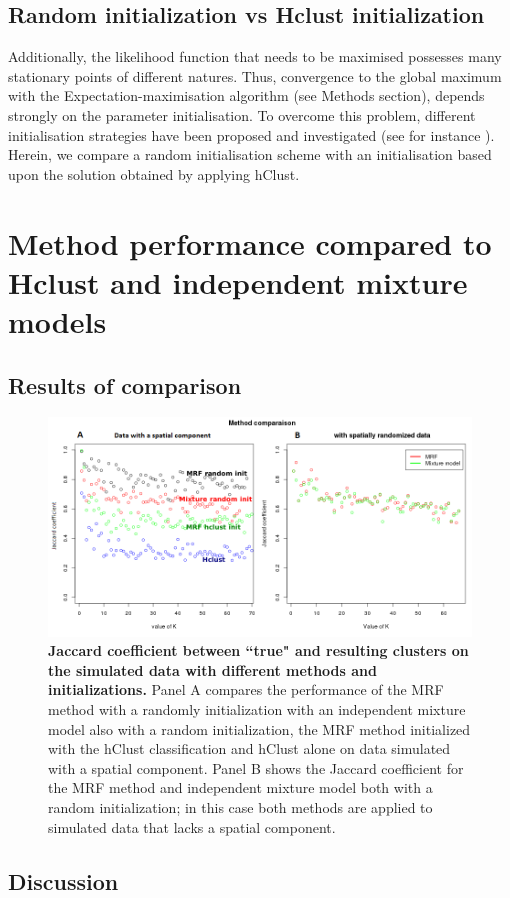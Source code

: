	\subsection{Random initialization vs Hclust initialization}
	Additionally, the likelihood function that needs to be maximised possesses many stationary points of different natures. Thus, convergence to the global maximum with the Expectation-maximisation algorithm (see Methods section), depends strongly on the parameter initialisation. To overcome this problem, different initialisation strategies have been proposed and investigated (see for instance \cite{biernacki03,karlis03,mclachlan04}). Herein, we compare a random initialisation scheme with an initialisation based upon the solution obtained by applying hClust.\\

\section{Method performance compared to Hclust and independent mixture models}
	\subsection{Results of comparison}
	\begin{figure}[h]
\centerline{\includegraphics[width=\linewidth]{gfx/chapter5/method_comparison.png}}
\caption{{\bf Jaccard coefficient between ``true" and resulting clusters on the simulated data with different methods and initializations.} Panel A compares the performance of the MRF method with a randomly initialization with an independent mixture model also with a random initialization, the MRF method initialized with the hClust classification and hClust alone on data simulated with a spatial component. Panel B shows the Jaccard coefficient for the MRF method and independent mixture model both with a random initialization; in this case both methods are applied to simulated data that lacks a spatial component.}
\label{fig:methodComparison}
	\end{figure}
	\subsection{Discussion}





